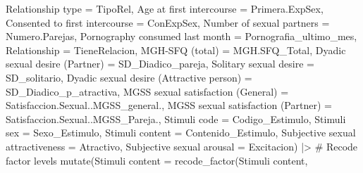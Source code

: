 \documentclass[
  bookmarksnumbered]{article}
\newenvironment{Shaded}{\begin{snugshade}}{\end{snugshade}}
\newcommand{\AttributeTok}[1]{\textcolor[rgb]{0.80,0.80,0.80}{#1}}
\newcommand{\CommentTok}[1]{\textcolor[rgb]{0.50,0.62,0.50}{#1}}
\newcommand{\FunctionTok}[1]{\textcolor[rgb]{0.94,0.94,0.56}{#1}}
\newcommand{\NormalTok}[1]{\textcolor[rgb]{0.80,0.80,0.80}{#1}}
\newcommand{\OtherTok}[1]{\textcolor[rgb]{0.94,0.94,0.56}{#1}}
\newcommand{\SpecialCharTok}[1]{\textcolor[rgb]{0.86,0.64,0.64}{#1}}
\newcommand{\StringTok}[1]{\textcolor[rgb]{0.80,0.58,0.58}{#1}}
\begin{document}
\begin{Shaded}
\begin{Highlighting}[]
         \StringTok{\textasciigrave{}}\AttributeTok{Relationship type}\StringTok{\textasciigrave{}} \OtherTok{=}\NormalTok{ TipoRel, }
         \StringTok{\textasciigrave{}}\AttributeTok{Age at first intercourse}\StringTok{\textasciigrave{}} \OtherTok{=}\NormalTok{ Primera.ExpSex,}
         \StringTok{\textasciigrave{}}\AttributeTok{Consented to first intercourse}\StringTok{\textasciigrave{}} \OtherTok{=}\NormalTok{ ConExpSex,}
         \StringTok{\textasciigrave{}}\AttributeTok{Number of sexual partners}\StringTok{\textasciigrave{}} \OtherTok{=}\NormalTok{ Numero.Parejas,}
         \StringTok{\textasciigrave{}}\AttributeTok{Pornography consumed last month}\StringTok{\textasciigrave{}} \OtherTok{=}\NormalTok{ Pornografia\_ultimo\_mes,}
         \AttributeTok{Relationship =}\NormalTok{ TieneRelacion, }
         \StringTok{\textasciigrave{}}\AttributeTok{MGH{-}SFQ (total)}\StringTok{\textasciigrave{}} \OtherTok{=}\NormalTok{ MGH.SFQ\_Total,}
         \StringTok{\textasciigrave{}}\AttributeTok{Dyadic sexual desire (Partner)}\StringTok{\textasciigrave{}} \OtherTok{=}\NormalTok{ SD\_Diadico\_pareja,}
         \StringTok{\textasciigrave{}}\AttributeTok{Solitary sexual desire}\StringTok{\textasciigrave{}} \OtherTok{=}\NormalTok{ SD\_solitario,}
         \StringTok{\textasciigrave{}}\AttributeTok{Dyadic sexual desire (Attractive person)}\StringTok{\textasciigrave{}} \OtherTok{=}\NormalTok{ SD\_Diadico\_p\_atractiva,}
         \StringTok{\textasciigrave{}}\AttributeTok{MGSS sexual satisfaction (General)}\StringTok{\textasciigrave{}} \OtherTok{=}\NormalTok{ Satisfaccion.Sexual..MGSS\_general.,}
         \StringTok{\textasciigrave{}}\AttributeTok{MGSS sexual satisfaction (Partner)}\StringTok{\textasciigrave{}} \OtherTok{=}\NormalTok{ Satisfaccion.Sexual..MGSS\_Pareja.,}
         \StringTok{\textasciigrave{}}\AttributeTok{Stimuli code}\StringTok{\textasciigrave{}} \OtherTok{=}\NormalTok{ Codigo\_Estimulo, }
         \StringTok{\textasciigrave{}}\AttributeTok{Stimuli sex}\StringTok{\textasciigrave{}} \OtherTok{=}\NormalTok{ Sexo\_Estimulo,}
         \StringTok{\textasciigrave{}}\AttributeTok{Stimuli content}\StringTok{\textasciigrave{}} \OtherTok{=}\NormalTok{ Contenido\_Estimulo,}
         \StringTok{\textasciigrave{}}\AttributeTok{Subjective sexual attractiveness}\StringTok{\textasciigrave{}} \OtherTok{=}\NormalTok{ Atractivo,}
         \StringTok{\textasciigrave{}}\AttributeTok{Subjective sexual arousal}\StringTok{\textasciigrave{}} \OtherTok{=}\NormalTok{ Excitacion) }\SpecialCharTok{|\textgreater{}}
  \CommentTok{\# Recode factor levels}
  \FunctionTok{mutate}\NormalTok{(}\StringTok{\textasciigrave{}}\AttributeTok{Stimuli content}\StringTok{\textasciigrave{}} \OtherTok{=} \FunctionTok{recode\_factor}\NormalTok{(}\StringTok{\textasciigrave{}}\AttributeTok{Stimuli content}\StringTok{\textasciigrave{}}\NormalTok{, }

\end{Highlighting}
\end{Shaded}
\end{document}
